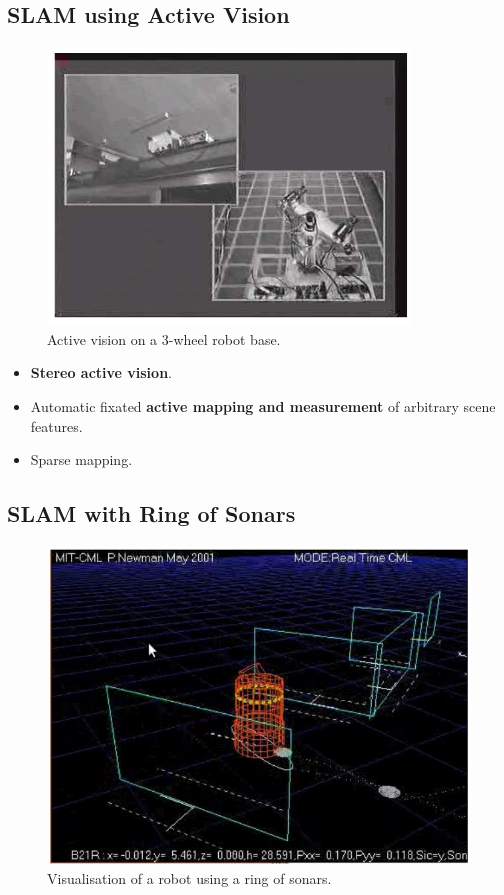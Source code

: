 \documentclass[11pt]{article}
\begin{document}
\subsection{SLAM using Active Vision}
\begin{figure}[h]
  \caption{Active vision on a 3-wheel robot base.}
  \includegraphics[scale=0.4]{activevision}
  \centering
\end{figure}

\begin{itemize}
  \item \textbf{Stereo active vision}.
  \item Automatic fixated \textbf{active mapping and measurement} of arbitrary scene features.
  \item Sparse mapping.
\end{itemize}

\subsection{SLAM with Ring of Sonars}
\begin{figure}[h]
  \caption{Visualisation of a robot using a ring of sonars.}
  \includegraphics[scale=0.4]{ringofsonars}
  \centering
\end{figure}
\end{document}
